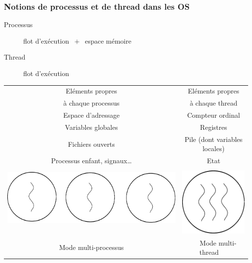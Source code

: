 \documentclass[xcolor={x11names,svgnames}]{beamer}
\begin{document}
\begin{frame}
  \frametitle{Notions de processus et de thread dans les OS}

\begin{description}
\item[Processus] \og flot d'exécution \fg $~+~$ \og espace mémoire \fg 
\item[Thread] \og flot d'exécution \fg 
\end{description}

\pause 

\bigskip

\centering

\begin{tabular}{c|c}
Eléments propres   & Eléments propres \\
à chaque processus & à chaque thread \\ 
\hline
Espace d'adressage & Compteur ordinal \\ 
Variables globales & Registres \\
Fichiers ouverts & Pile (dont variables locales)\\
  Processus enfant, signaux\dots & Etat \\
  \hline
  \\
    \includegraphics[height=0.15\textheight]{multi-processus}$\quad$&
    \includegraphics[height=0.15\textheight]{multi-thread} \\
    Mode multi-processus    &
    $\quad$ Mode multi-thread $\quad$ \\
\end{tabular}
\end{frame} 
\end{document}
